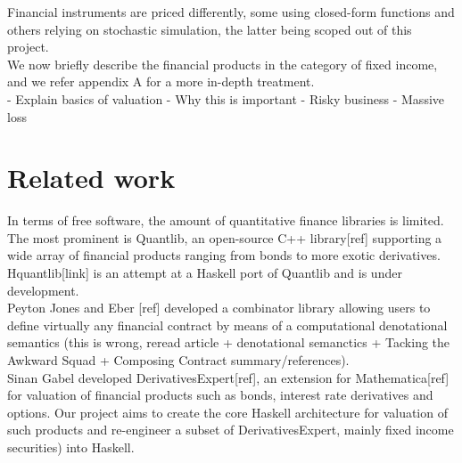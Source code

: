 Financial instruments are priced differently, some using closed-form functions 
and others relying on stochastic simulation, the latter being scoped out of 
this project.\\

We now briefly describe the financial products in the category of fixed income, 
and we refer appendix A for a more in-depth treatment.\\

- Explain basics of valuation
- Why this is important
	- Risky business
	- Massive loss


\section{Related work}

In terms of free software, the amount of quantitative finance libraries is 
limited.
The most prominent is Quantlib, an open-source C++ library[ref] supporting a 
wide array of financial products ranging from bonds to more exotic derivatives.\\

Hquantlib[link] is an attempt at a Haskell port of Quantlib and is under 
development.\\

Peyton Jones and Eber [ref] developed a combinator library allowing users to 
define virtually any financial contract by means of a computational 
denotational semantics (this is wrong, reread article + denotational semanctics 
+ Tacking the Awkward Squad + Composing Contract summary/references).\\

Sinan Gabel developed DerivativesExpert[ref], an extension for Mathematica[ref] 
for valuation of financial products such as bonds, interest rate derivatives 
and options. Our project aims to create the core Haskell architecture for 
valuation of such products and re-engineer a subset of DerivativesExpert, 
mainly fixed income securities) into Haskell.
